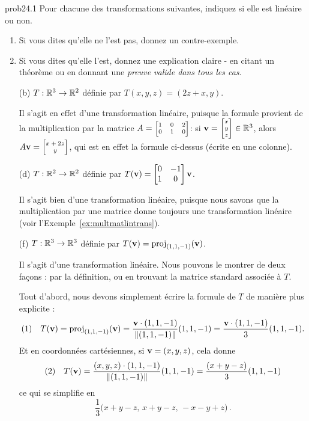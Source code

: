 
\begin{sol}{prob24.1}  Pour chacune des transformations suivantes, indiquez si elle est linéaire ou non.   
   \smallskip    
\begin{enumerate}[$\bullet$]
\item Si vous dites qu'elle ne l'est pas, donnez un contre-exemple.   
\item Si vous dites qu'elle l'est, donnez une explication claire - en citant un théorème ou en donnant une {\it preuve valide dans tous les cas}. 
\end{enumerate}
\medskip
\begin{enumerate}[]

\medskip
\item[(b)] $T:\mathbb{R}^3 \to \mathbb{R}^2$ d\'efinie par $T(x,y,z)=(2 z+x, y)$.

\soln Il s'agit en effet d'une transformation linéaire, puisque la formule provient de la multiplication par la matrice $A=\scriptsize\bmatrix 1&0&2\\0&1&0 \endbmatrix$: si $\vv=\scriptsize\bmatrix x\\y\\z \endbmatrix \in \R^3$, alors $A\vv=\scriptsize\bmatrix x+2z\\y \endbmatrix$, qui est en effet la formule ci-dessus (écrite en une colonne).
\medskip



\item[(d)] $T:\mathbb{R}^2 \to \mathbb{R}^2$ d\'efinie par $T(\vv)=\bmatrix 0&-1\\ 1&0 \endbmatrix \vv$.

\soln Il s'agit bien d'une transformation linéaire, puisque nous savons que la multiplication par une matrice donne toujours une transformation linéaire  (voir l'Exemple~\ref{ex:multmatlintrans}).
\medskip




\item[(f)] $T:\mathbb{R}^3 \to \mathbb{R}^3$ d\'efinie par $T(\mathbf{v})= \operatorname{proj}_{(1,1,-1)}(\mathbf{v})$.

\soln Il s'agit d'une transformation linéaire. Nous pouvons le montrer de deux façons : par la définition, ou en trouvant la matrice standard associée à $T$.

Tout d'abord, nous devons simplement écrire la formule de $T$ de manière plus explicite : $$ (1)\quad T(\mathbf{v})= \operatorname{proj}_{(1,1,-1)}(\mathbf{v})=\frac{\mathbf{v}\cdot (1,1,-1)}{\|(1,1,-1)\|}(1,1,-1)=\frac{\mathbf{v}\cdot (1,1,-1)}{3}(1,1,-1). $$ 
Et en coordonnées cartésiennes, si $\mathbf{v}=(x,y,z)$, cela donne
$$(2)\quad T(\mathbf{v})=  \frac{(x,y,z)\cdot (1,1,-1)}{\|(1,1,-1)\|}(1,1,-1)= \frac{ (x+y-z )}{3}(1,1,-1)$$ ce qui se simplifie en 
$$\frac13\Big(x+y-z,\,x+y-z,\,-x-y+z\Big)\,.$$


\end{enumerate}
\end{sol}
